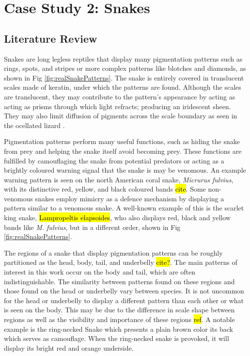 \chapter{Case Study 2: Snakes}
\section{Literature Review}
Snakes are long legless reptiles that display many pigmentation patterns such as rings, spots, and stripes or more complex patterns like blotches and diamonds, as shown in Fig \ref{fig:realSnakePatterns}. The snake is entirely covered in translucent scales made of keratin, under which the patterns are found. Although the scales are translucent, they may contribute to the pattern's appearance by acting as acting as prisms through which light refracts; producing an iridescent sheen. They may also limit diffusion of pigments across the scale boundary as seen in the ocellated lizard \cite{manukyan2017}.

Pigmentation patterns perform many useful functions, such as hiding the snake from prey and helping the snake itself avoid becoming prey. These functions are fulfilled by camouflaging the snake from potential predators or acting as a brightly coloured warning signal that the snake is may be venomous. An example warning pattern is seen on the north American coral snake, \textit{Micrurus fulvius}, with its distinctive red, yellow, and black coloured bands \hl{cite}. Some non-venomous snakes employ mimicry as a defence mechanism by displaying a pattern similar to a venomous snake. A well-known example of this is the scarlet king snake, \hl{Lampropeltis elapsoides}, who also displays red, black and yellow bands like \textit{M. fulvius}, but in a different order, shown in Fig \ref{fig:realSnakePatterns}.

The regions of a snake that display pigmentation patterns can be roughly partitioned as the head, body, tail, and underbelly \hl{cite?}. The main patterns of interest in this work occur on the body and tail, which are often indistinguishable. The similarity between patterns found on these regions and those found on the head or underbelly vary between species. It is not uncommon for the head or underbelly to display a different pattern than each other or what is seen on the body. This may be due to the difference in scale shape between regions as well as the visibility and importance of these regions \hl{ref}. A notable example is the ring-necked Snake which presents a plain brown color its back which serves as camouflage. When the ring-necked snake is provoked, it will display its bright red and orange underside.

